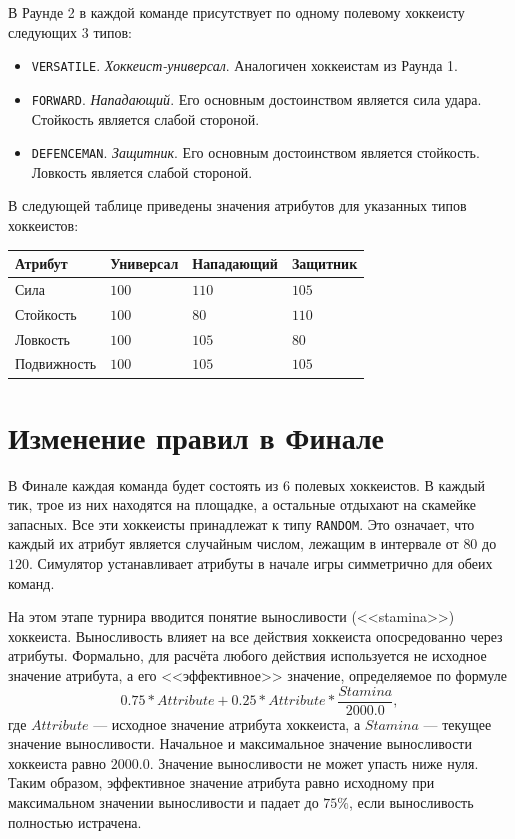В Раунде 2 в каждой команде присутствует по одному полевому хоккеисту следующих $3$ типов:
\begin{itemize}
  \item \texttt{VERSATILE}. \textit{Хоккеист-универсал}. Аналогичен хоккеистам из Раунда 1.
  \item \texttt{FORWARD}. \textit{Нападающий}. Его основным достоинством является сила удара. Стойкость является слабой стороной.
  \item \texttt{DEFENCEMAN}. \textit{Защитник}. Его основным достоинством является стойкость. Ловкость является слабой стороной.
\end{itemize}

В следующей таблице приведены значения атрибутов для указанных типов хоккеистов:

\begin{tabular}{| l | l | l | l |}
  \hline
  Атрибут & Универсал & Нападающий & Защитник \\
  \hline
  Сила & $100$ & $110$ & $105$ \\
  Стойкость & $100$ & $80$ & $110$ \\
  Ловкость & $100$ & $105$ & $80$ \\
  Подвижность & $100$ & $105$ & $105$ \\
  \hline
\end{tabular}

\section{Изменение правил в Финале}

В Финале каждая команда будет состоять из $6$ полевых хоккеистов. В каждый тик, трое из них находятся на площадке, а остальные отдыхают на
скамейке запасных. Все эти хоккеисты принадлежат к типу \texttt{RANDOM}. Это означает, что каждый их атрибут является случайным числом,
лежащим в интервале от $80$ до $120$. Симулятор устанавливает атрибуты в начале игры симметрично для обеих команд.

На этом этапе турнира вводится понятие выносливости (<<stamina>>) хоккеиста. Выносливость влияет на все действия хоккеиста опосредованно
через атрибуты. Формально, для расчёта любого действия используется не исходное значение атрибута, а его <<эффективное>> значение,
определяемое по формуле
\begin{equation}
0.75*Attribute+0.25*Attribute*\frac{Stamina}{2000.0},
\end{equation}
где $Attribute$ --- исходное значение атрибута хоккеиста, а $Stamina$ --- текущее значение выносливости. Начальное и максимальное значение
выносливости хоккеиста равно $2000.0$. Значение выносливости не может упасть ниже нуля. Таким образом, эффективное значение атрибута равно
исходному при максимальном значении выносливости и падает до $75\%$, если выносливость полностью истрачена.

